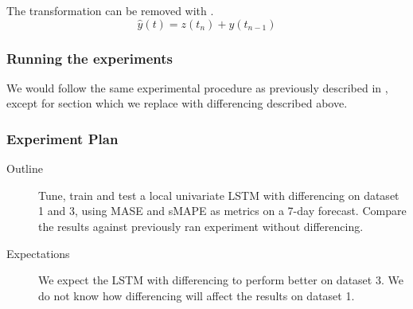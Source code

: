 The transformation can be removed with .
\begin{equation}
  \hat{y}(t) = z(t_n) + y(t_{ n-1 })
  \label{eq:differencing-inverted}
\end{equation}

\subsubsection{Running the experiments}
We would follow the same experimental procedure as previously described in ,
except for section  which we replace with differencing described above.


\subsubsection{Experiment Plan}
\begin{description}
  \item[Outline]{
              Tune, train and test a local univariate LSTM with differencing
              on dataset 1 and 3,
              using MASE and sMAPE as metrics on a 7-day forecast.
              Compare the results against previously ran experiment without differencing.
        }
\end{description}

\begin{description}
  \item[Expectations]{
              We expect the LSTM with differencing to perform better on dataset 3.
              We do not know how differencing will affect the results on dataset 1.
        }
\end{description}


